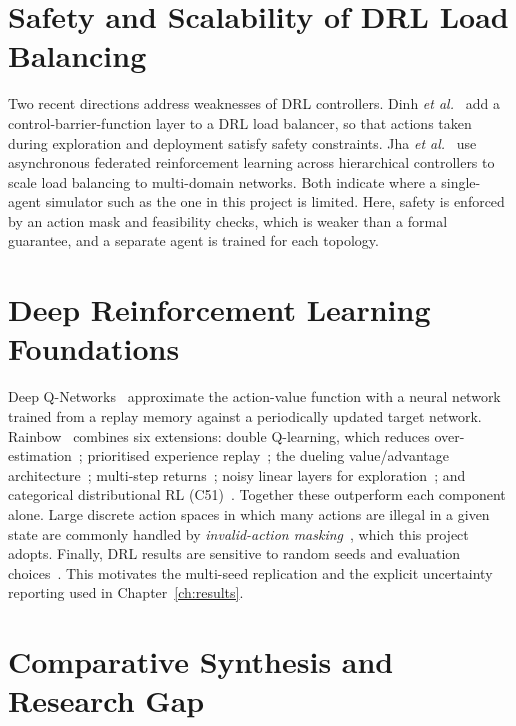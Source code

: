 \section{Safety and Scalability of DRL Load Balancing}
\label{sec:rw-safety}

Two recent directions address weaknesses of DRL controllers. Dinh \emph{et al.}~\cite{dinh2025safe} add a control-barrier-function layer to a DRL load balancer, so that actions taken during exploration and deployment satisfy safety constraints. Jha \emph{et al.}~\cite{jha2026federated} use asynchronous federated reinforcement learning across hierarchical controllers to scale load balancing to multi-domain networks. Both indicate where a single-agent simulator such as the one in this project is limited. Here, safety is enforced by an action mask and feasibility checks, which is weaker than a formal guarantee, and a separate agent is trained for each topology.

\section{Deep Reinforcement Learning Foundations}
\label{sec:rw-drl}

Deep Q-Networks~\cite{mnih2015dqn} approximate the action-value function with a neural network trained from a replay memory against a periodically updated target network. Rainbow~\cite{hessel2018rainbow} combines six extensions: double Q-learning, which reduces over-estimation~\cite{vanhasselt2016double}; prioritised experience replay~\cite{schaul2016per}; the dueling value/advantage architecture~\cite{wang2016dueling}; multi-step returns~\cite{sutton2018rl}; noisy linear layers for exploration~\cite{fortunato2018noisy}; and categorical distributional RL (C51)~\cite{bellemare2017c51}. Together these outperform each component alone. Large discrete action spaces in which many actions are illegal in a given state are commonly handled by \emph{invalid-action masking}~\cite{huang2022masking}, which this project adopts. Finally, DRL results are sensitive to random seeds and evaluation choices~\cite{henderson2018matters,agarwal2021precipice}. This motivates the multi-seed replication and the explicit uncertainty reporting used in Chapter~\ref{ch:results}.

\section{Comparative Synthesis and Research Gap}
\label{sec:gap}

